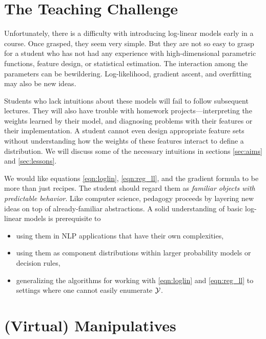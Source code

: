\documentclass[11pt,letterpaper]{article}
\begin{document}
\section{The Teaching Challenge} \label{sec:challenges}

Unfortunately, there is a difficulty with introducing log-linear
models early in a course.  Once grasped, they seem very simple.  But
they are not so easy to grasp for a student who has not had any
experience with high-dimensional parametric functions, feature
design, or statistical estimation.  The interaction among the parameters can be
bewildering.  Log-likelihood, gradient ascent, and overfitting may also
be new ideas.

Students who lack intuitions about these models will fail to follow
subsequent lectures.  They will also have trouble with homework
projects---interpreting the weights learned by their model, and
diagnosing problems with their features or their implementation.  A
student cannot even design appropriate feature sets without
understanding how the weights of these features interact to define a
distribution.  We will discuss some of the necessary intuitions in
sections \ref{sec:aims} and \ref{sec:lessons}.

We would like equations \eqref{eqn:loglin}, \eqref{eqn:reg_ll}, and the
gradient formula to be more than just recipes.  The student should
regard them as {\em familiar objects with predictable behavior}.  Like
computer science, pedagogy proceeds by layering new ideas on top of
already-familiar abstractions.  A solid understanding of basic
log-linear models is prerequisite to 
\begin{itemize}
\item using them in NLP applications that have their own complexities, 
\item using them as component distributions within larger probability
  models or decision rules,
\item generalizing the algorithms for working with \eqref{eqn:loglin}
  and \eqref{eqn:reg_ll} to settings where one cannot easily enumerate
  ${\cal Y}$.
\end{itemize}
  
\section{(Virtual) Manipulatives}
\end{document}

